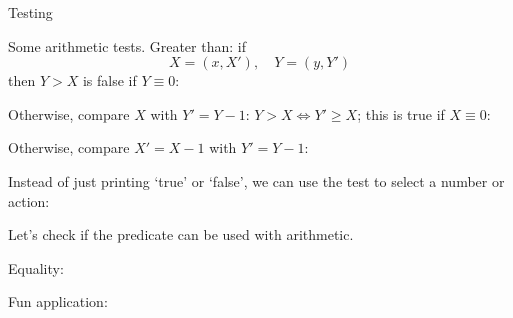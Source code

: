  {Testing}

Some arithmetic tests. Greater than: if
\[ X = (x,X'), \quad Y = (y,Y') \]
then $Y>X$ is false if $Y\equiv0$:
\begin{inputwithcode}
\def\GreaterThan#1#2{#2{\GreaterEqualp{#1}}\False}
\end{inputwithcode}
Otherwise, compare $X$ with $Y'=Y-1$: $Y>X\Leftrightarrow Y'\geq X$;
this is true if $X\equiv0$:
\begin{inputwithcode}
\def\GreaterEqualp#1#2#3{\GreaterEqual{#1}{#3}}
\def\GreaterEqual#1#2{#1{\LessThanp{#2}}\True}
\end{inputwithcode}
Otherwise, compare $X'=X-1$ with $Y'=Y-1$:
\begin{inputwithcode}
\def\LessThanp#1#2#3{\GreaterThan{#3}{#1}}
\end{inputwithcode}
\begin{logixx}
\end{logixx}
Instead of just printing `true' or `false', we can use the test to
select a number or action:
\begin{logix}
\end{logix}
Let's check if the predicate can be used with arithmetic.
\begin{logix}
\end{logix}

Equality:
\begin{inputwithcode}
\def\Equal#1#2{#2{\Equalp{#1}}{\IsZero{#1}}}
\def\Equalp#1#2#3{#1{\Equalx{#3}}{\IsOne{#2}}}
\def\Equalx#1#2#3{\Equal{#1}{#3}}
\end{inputwithcode}
\begin{logixx}
\end{logixx}

Fun application: \ndef{}
\begin{inputwithcode}
\def\Mod#1#2{%
  \Equal{#1}{#2}\Zero
    {\GreaterThan{#1}{#2}%
       {\Mod{#1}{\Sub{#1}{#2}}}%
       {#2}%
    }}
\end{inputwithcode}
\begin{logix}
\end{logix}

